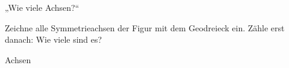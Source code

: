 \setcounter{aufgabe}{15}

\begin{aufgabe}{„Wie viele Achsen?“}
\begin{teile}
\teil Zeichne alle Symmetrieachsen der Figur mit dem Geodreieck ein. Zähle erst danach: Wie viele sind es?

\leerfeld Achsen
\end{teile}
\end{aufgabe}

